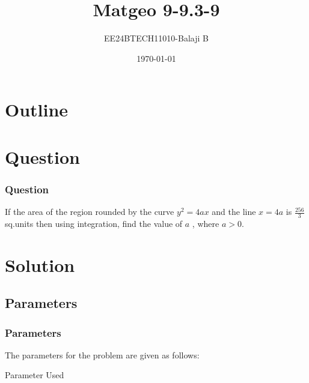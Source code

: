\documentclass{beamer}
\title{Matgeo 9-9.3-9}
\author{EE24BTECH11010-Balaji B}
\date{\today}
\theoremstyle{remark}
\numberwithin{equation}{section}
\begin{document}
\begin{frame}
\titlepage
\end{frame}

\section*{Outline}
\begin{frame}
\tableofcontents
\end{frame}

\section{Question}
\begin{frame}
\frametitle{Question}
If the area of the region rounded by the curve $y^2 = 4ax$ and the line $x = 4a $ is $\frac{256}{3}$ sq.units then using integration, find the value of $a$ , where $a > 0$.
\end{frame}

\section{Solution}
\subsection{Parameters}
\begin{frame}
\frametitle{Parameters}
The parameters for the problem are given as follows:
\begin{table}[H]
    \centering
    
    \caption{Parameter Used}
    \label{tab1-1.9-6}
\end{table}

\end{frame}
\end{document}
